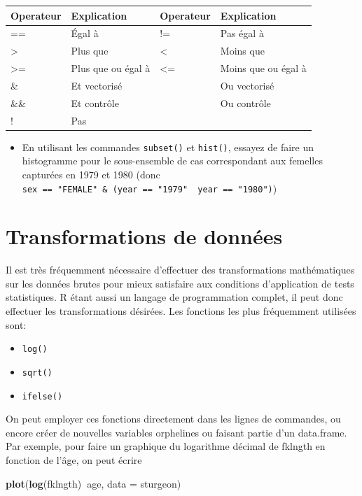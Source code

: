 \documentclass[12pt,]{book}
\newenvironment{Shaded}{\begin{snugshade}}{\end{snugshade}}
\newcommand{\DataTypeTok}[1]{\textcolor[rgb]{0.27,0.27,0.27}{#1}}
\newcommand{\KeywordTok}[1]{\textcolor[rgb]{0.27,0.27,0.27}{\textbf{#1}}}
\newcommand{\NormalTok}[1]{#1}
\newcommand{\OperatorTok}[1]{\textcolor[rgb]{0.43,0.43,0.43}{\textbf{#1}}}
\providecommand{\tightlist}{%
  \setlength{\itemsep}{0pt}\setlength{\parskip}{0pt}}
\begin{document}
\begin{longtable}[]{@{}llll@{}}
\toprule
Operateur & Explication & Operateur & Explication\tabularnewline
\midrule
\endhead
== & Égal à & != & Pas égal à\tabularnewline
\textgreater{} & Plus que & \textless{} & Moins que\tabularnewline
\textgreater{}= & Plus que ou égal à & \textless{}= & Moins que ou égal à\tabularnewline
\& & Et vectorisé & \textbar{} & Ou vectorisé\tabularnewline
\&\& & Et contrôle & \textbar{}\textbar{} & Ou contrôle\tabularnewline
! & Pas & &\tabularnewline
\bottomrule
\end{longtable}

\begin{itemize}
\tightlist
\item
  En utilisant les commandes \texttt{subset()} et \texttt{hist()}, essayez de faire un histogramme pour le sous-ensemble de cas correspondant aux femelles capturées en 1979 et 1980 (donc \texttt{sex\ ==\ "FEMALE"\ \&\ (year\ ==\ "1979"\ \textbar{}\ year\ ==\ "1980")})
\end{itemize}

\hypertarget{transformations-de-donnuxe9es}{%
\section{Transformations de données}\label{transformations-de-donnuxe9es}}

Il est très fréquemment nécessaire d'effectuer des transformations mathématiques sur les données brutes pour mieux satisfaire aux conditions d'application de tests statistiques.
R étant aussi un langage de programmation complet, il peut donc effectuer les transformations désirées.
Les fonctions les plus fréquemment utilisées sont:

\begin{itemize}
\tightlist
\item
  \texttt{log()}
\item
  \texttt{sqrt()}
\item
  \texttt{ifelse()}
\end{itemize}

On peut employer ces fonctions directement dans les lignes de commandes, ou encore créer de nouvelles variables orphelines ou faisant partie d'un data.frame.
Par exemple, pour faire un graphique du logarithme décimal de fklngth en fonction de l'âge, on peut écrire

\begin{Shaded}
\begin{Highlighting}[]
\KeywordTok{plot}\NormalTok{(}\KeywordTok{log}\NormalTok{(fklngth)}\OperatorTok{~}\NormalTok{age, }\DataTypeTok{data =}\NormalTok{ sturgeon)}
\end{Highlighting}
\end{Shaded}
\end{document}

